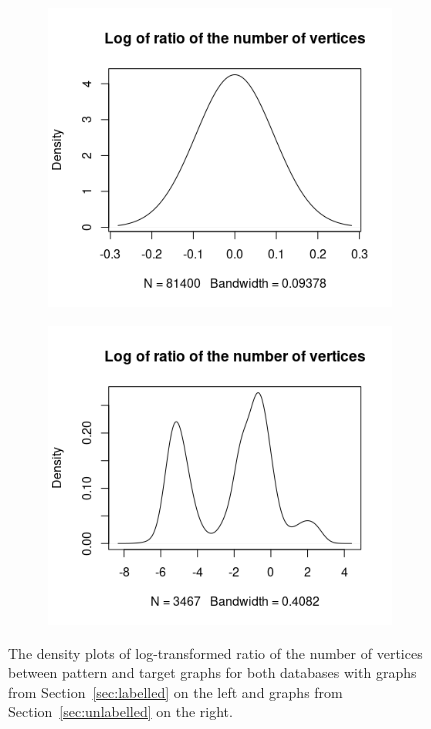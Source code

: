 \documentclass{l4proj}
\theoremstyle{definition}
\theoremstyle{remark}
\begin{document}
\begin{figure}
  \centering
  \begin{subfigure}[t]{0.49\textwidth}
    \centering
    \includegraphics[width=\textwidth]{images/mcs_ratio_vertices.png}
  \end{subfigure}
  \begin{subfigure}[t]{0.49\textwidth}
    \centering
    \includegraphics[width=\textwidth]{images/sip_ratio_vertices.png}
  \end{subfigure}
  \caption{The density plots of log-transformed ratio of the number of vertices
    between pattern and target graphs for both databases with graphs from
    Section~\ref{sec:labelled} on the left and graphs from
    Section~\ref{sec:unlabelled} on the right.}
  \label{fig:ratio_vertices}
\end{figure}
\end{document}
